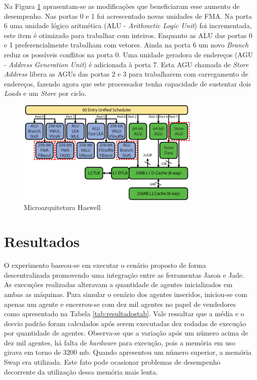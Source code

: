 \documentclass[conference]{IEEEtran}
\begin{document}
        Na Figura \ref{hm} aprasentam-se as modificações que beneficiaram esse aumento de desempenho. Nas portas 0 e 1 foi acrescentado novas unidades de FMA. Na porta 6 uma unidade lógico aritmética (ALU - \textit{Arithmetic Logic Unit}) foi incrementada, este item é otimizado para trabalhar com inteiros. Enquanto as ALU das portas 0 e 1 preferencialmente trabalham com vetores. Ainda na porta 6 um novo \textit{Branch} reduz os possíveis conflitos na porta 0. Uma unidade geradora de endereços (AGU - \textit{Address Generation Unit}) é adicionada à porta 7. Esta AGU chamada de \textit{Store Address} libera as AGUs das portas 2 e 3 para trabalharem com carregamento de endereços, fazendo agora que este processador tenha capacidade de sustentar dois \textit{Loads} e um \textit{Store} por ciclo\cite{hammarlund20134th}.

        \begin{figure}[ht]
        \centering
        \includegraphics[width=3.5in]{haswell.png}
        \caption{Microarquitetura Haswell}
        \label{hm}
        \end{figure}
        
        \section{Resultados}
        
        O experimento baseou-se em executar o cenário proposto de forma descentralizada promovendo uma integração entre as ferramentas Jason e Jade. As execuções realizadas alteravam a quantidade de agentes inicializados em ambas as máquinas. Para simular o cenário dos agentes inseridos, iniciou-se com apenas um agente e encerrou-se com dez mil agentes no papel de vendedores como apresentado na Tabela \ref{tab:resultadostab}. Vale ressaltar que a média e o desvio padrão foram calculados após serem executadas dez rodadas de execução por quantidade de agentes. Observa-se que a variação após um número acima de dez mil agentes, há falta de \textit{hardware} para execução, pois a memória em uso girava em torno de 3200 mb. Quando apresentou um número superior, a memória Swap era utilizada. Este fato pode ocasionar problemas de desempenho decorrente da utilização dessa memória mais lenta.
        
\end{document}

